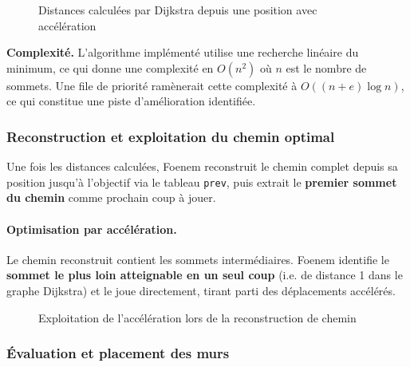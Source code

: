 \documentclass[12pt,a4paper]{article}
\begin{document}
\begin{figure}[h]
\centering
\caption{Distances calculées par Dijkstra depuis une position avec accélération}
\end{figure}

\noindent \textbf{Complexité.} L'algorithme implémenté utilise une recherche 
linéaire du minimum, ce qui donne une complexité en $O(n^2)$ où $n$ est le 
nombre de sommets. Une file de priorité 
ramènerait cette complexité à $O((n + e) \log n)$, ce qui constitue une 
piste d'amélioration identifiée.

\subsubsection{Reconstruction et exploitation du chemin optimal}

Une fois les distances calculées, Foenem reconstruit le chemin complet 
depuis sa position jusqu'à l'objectif via le tableau \texttt{prev}, puis 
extrait le \textbf{premier sommet du chemin} comme prochain coup à jouer.

\paragraph{Optimisation par accélération.} Le chemin reconstruit contient 
les sommets intermédiaires. Foenem identifie le \textbf{sommet le plus loin 
atteignable en un seul coup} (i.e. de distance 1 dans le graphe Dijkstra) 
et le joue directement, tirant parti des déplacements accélérés.

\begin{figure}[h]
\centering
\caption{Exploitation de l'accélération lors de la reconstruction de chemin}
\end{figure}

\subsubsection{Évaluation et placement des murs}
\end{document}

